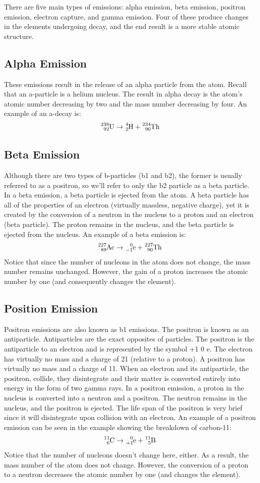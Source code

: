 There are five main types of emissions: alpha emission, beta emission, positron emission, electron 
capture, and gamma emission. Four of these produce changes in the elements undergoing decay, and 
the end result is a more stable atomic structure.

\subsection{Alpha Emission}
These emissions result in the release of an alpha particle from the atom. Recall that an 
a-particle is a helium nucleus. The result in alpha decay is the atom’s atomic number decreasing 
by two and the mass number decreasing by four. An example of an a-decay is:
\[
    \ch{^{238}_{92}U}\to \ch{^{4}_{2}H}+\ch{^{234}_{90}Th}
\]

\subsection{Beta Emission}
Although there are two types of b-particles (b1 and b2), the former is usually referred to as a 
positron, so we’ll refer to only the b2 particle as a beta particle. In a beta emission, a beta 
particle is ejected from the atom. A beta particle has all of the properties of an electron 
(virtually massless, negative charge), yet it is created by the conversion of a neutron in the 
nucleus to a proton and an electron (beta particle). The proton remains in the nucleus, and the 
beta particle is ejected from the nucleus. An example of a beta emission is:
\[
    \ch{^{227}_{89}Ac}\to \ch{^{0}_{-1}e}+\ch{^{227}_{90}Th}
\]
Notice that since the number of nucleons in the atom does not change, the mass number remains 
unchanged. However, the gain of a proton increases the atomic number by one (and consequently 
changes the element).

\subsection{Position Emission}
Positron emissions are also known as b1 emissions. The positron is known as an antiparticle. 
Antiparticles are the exact opposites of particles. The positron is the antiparticle to an 
electron and is represented by the symbol +1 0 e. The electron has virtually no mass and a charge 
of 21 (relative to a proton). A positron has virtually no mass and a charge of 11. When an 
electron and its antiparticle, the positron, collide, they disintegrate and their matter is 
converted entirely into energy in the form of two gamma rays. In a positron emission, a proton in 
the nucleus is converted into a neutron and a positron. The neutron remains in the nucleus, and 
the positron is ejected. The life span of the positron is very brief since it will disintegrate 
upon collision with an electron. An example of a positron emission can be seen in the example 
showing the breakdown of carbon-11:
\[
    \ch{^{11}_{6}C}\to \ch{^{0}_{+1}e}+\ch{^{11}_{5}B}
\]
Notice that the number of nucleons doesn’t change here, either. As a result, the mass number of 
the atom does not change. However, the conversion of a proton to a neutron decreases the atomic 
number by one (and changes the element).

